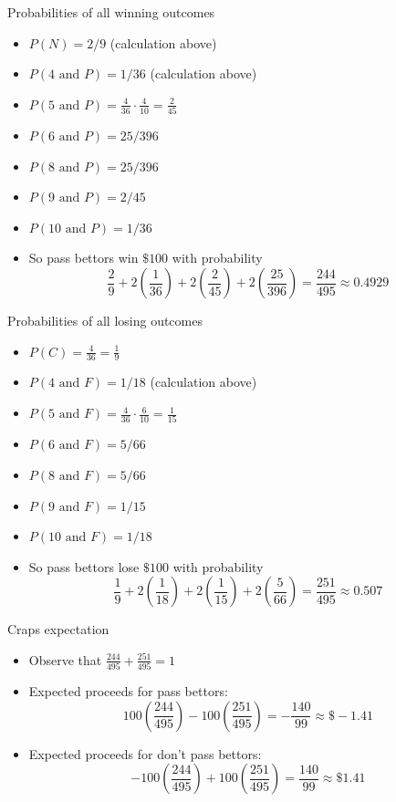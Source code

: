 \documentclass[handout]{beamer}
\theoremstyle{definition}
\begin{document}
\begin{frame}{Probabilities of all winning outcomes}
\begin{itemize}
\item $P\left(N\right)=2/9$ (calculation above)
\item $P\left(\text{$4$ and $P$}\right)=1/36$ (calculation above)
\item $P\left(\text{$5$ and $P$}\right)=\frac{4}{36}\cdot\frac{4}{10}
=\frac{2}{45}$
\item $P\left(\text{$6$ and $P$}\right)=25/396$
\item $P\left(\text{$8$ and $P$}\right)=25/396$
\item $P\left(\text{$9$ and $P$}\right)=2/45$
\item $P\left(\text{$10$ and $P$}\right)=1/36$
\item So pass bettors win $\$100$ with probability
\[\frac{2}{9}+2\left(\frac{1}{36}\right)
+2\left(\frac{2}{45}\right)+2\left(\frac{25}{396}\right)
=\frac{244}{495}\approx 0.4929\]
\end{itemize}
\end{frame}

\begin{frame}{Probabilities of all losing outcomes}
\begin{itemize}
\item $P\left(C\right)=\frac{4}{36}=\frac{1}{9}$
\item $P\left(\text{$4$ and $F$}\right)=1/18$ (calculation above)
\item $P\left(\text{$5$ and $F$}\right)=\frac{4}{36}\cdot\frac{6}{10}
=\frac{1}{15}$
\item $P\left(\text{$6$ and $F$}\right)=5/66$
\item $P\left(\text{$8$ and $F$}\right)=5/66$
\item $P\left(\text{$9$ and $F$}\right)=1/15$
\item $P\left(\text{$10$ and $F$}\right)=1/18$
\item So pass bettors lose $\$100$ with probability
\[\frac{1}{9}+2\left(\frac{1}{18}\right)
+2\left(\frac{1}{15}\right)+2\left(\frac{5}{66}\right)
=\frac{251}{495}\approx 0.507\]
\end{itemize}
\end{frame}

\begin{frame}{Craps expectation}
\begin{itemize}
\item Observe that $\frac{244}{495}+\frac{251}{495}=1$
\item Expected proceeds for pass bettors:
\[100\left(\frac{244}{495}\right)-100\left(\frac{251}{495}\right)
=-\frac{140}{99}\approx \$-1.41\]
\item Expected proceeds for don't pass bettors:
\[-100\left(\frac{244}{495}\right)+100\left(\frac{251}{495}\right)
=\frac{140}{99}\approx \$1.41\]
\end{itemize}
\end{frame}
\end{document}
